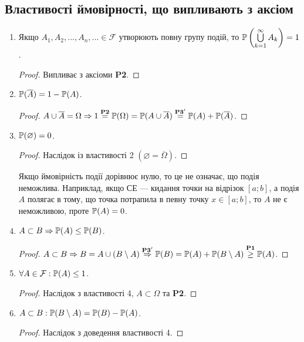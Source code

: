 \subsection{Властивості ймовірності, що випливають з аксіом}
\begin{enumerate}
    \item Якщо $A_1, A_2, ..., A_n, ... \in \mathcal{F}$ утворюють повну групу 
    подій, то $\P\left(\bigcup\limits_{k=1}^\infty A_k\right) = 1$.
    \begin{proof}
        Випливає з аксіоми \textbf{P2}.
    \end{proof}
    \item $\P(\overline{A}) = 1 - \P(A)$.
    \begin{proof}
        $A \cup \overline{A} = \Omega \Rightarrow 1 \overset{\text{\textbf{P2}}}{=} \P(\Omega) 
        = \P(A \cup \overline{A}) \overset{\text{\textbf{P3}}'}{=} \P(A) + \P(\overline{A})$.
    \end{proof}
    \item $\P(\varnothing) = 0$.
    \begin{proof}
        Наслідок із властивості 2 $(\varnothing = \overline{\Omega})$.
    \end{proof}
    \begin{remark}
        Якщо ймовірність події дорівнює нулю, то це не означає, що подія неможлива. Наприклад,
        якщо СЕ --- кидання точки на відрізок $[a; b]$, а подія $A$ полягає в тому, що точка потрапила в 
        певну точку $x \in [a; b]$, то $A$ не є неможливою, проте $\P(A) = 0$.
    \end{remark}
    \item $A \subset B \Rightarrow \P(A) \leq \P(B)$.
    \begin{proof}
        $A \subset B \Rightarrow B = A \cup (B \setminus A) 
        \overset{\text{\textbf{P3}}'}{\Rightarrow} \P(B) = \P(A) + \P(B \setminus A) 
        \overset{\text{\textbf{P1}}}{\geq} \P(A)$.
    \end{proof}
    \item $\forall A \in \mathcal{F}: \P(A) \leq 1$.
    \begin{proof}
        Наслідок з властивості 4, $A \subset \Omega$ та \textbf{P2}.
    \end{proof}
    \item $A \subset B: \P(B \setminus A) = \P(B) - \P(A)$.
    \begin{proof}
        Наслідок з доведення властивості 4.
    \end{proof}

\end{enumerate}
